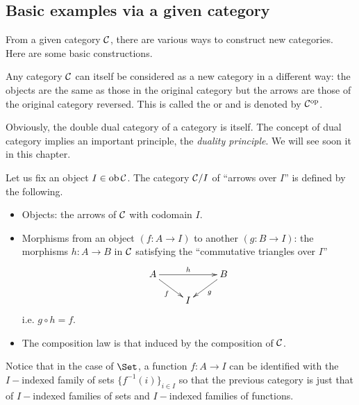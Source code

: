 \subsection{Basic examples via a given category}
From a given category ${\cal C}$, there are various ways to construct new categories. Here are some basic constructions.
\begin{exam}
  Any category ${\cal C}$ can itself be considered as a new category in a different way: the objects are the same as those in the original category but the arrows are those of the original category reversed. This is called the  or  and is denoted by ${\cal C}^{\operatorname{op}}$.
\end{exam}
Obviously, the double dual category of a category is itself. The concept of dual category implies an important principle, the \emph{duality principle}. We will see soon it in this chapter.
\begin{exam}
  Let us fix an object $I\in\operatorname{ob}{\cal C}$. The category ${\cal C}/I$ of ``arrows over $I$'' is defined by the following.
  \begin{itemize}
    \item Objects: the arrows of ${\cal C}$ with codomain $I$.
    \item Morphisms from an object $(f\colon A\to I)$ to another $(g\colon B\to I)$:
               the morphisms $h\colon A\to B$ in ${\cal C}$ satisfying the ``commutative triangles over $I$''
               \begin{displaymath}
                 \xymatrix@R=0.5cm{
                    A\ar[rr]^{h}\ar[dr]_{f} && B\ar[dl]^{g} \\
                    &I&                }
               \end{displaymath}
               i.e.  $g\circ h = f$.
    \item   The composition law is that induced by the composition of ${\cal C}$.
  \end{itemize}
\end{exam}
  \begin{rem}
    Notice that in the case of $\Set$, a function $f\colon A\to I$ can be identified with the $I-$indexed family of sets $\{f^{-1}(i)\}_{i\in I}$ so that the previous category is just that of $I-$indexed families of sets and $I-$indexed families of functions.
  \end{rem}

